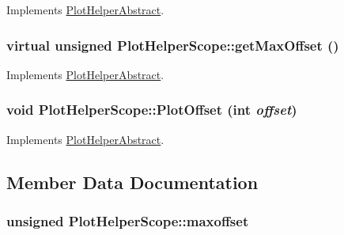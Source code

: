 Implements \hyperlink{class_plot_helper_abstract_63305b07bebbbaa71cedbf8e05d05dfa}{PlotHelperAbstract}.\hypertarget{class_plot_helper_scope_a57366f18a378b4c7517ee46e21ab31b}{
\subsubsection[{getMaxOffset}]{\setlength{\rightskip}{0pt plus 5cm}virtual unsigned PlotHelperScope::getMaxOffset ()}}
\label{class_plot_helper_scope_a57366f18a378b4c7517ee46e21ab31b}




Implements \hyperlink{class_plot_helper_abstract_099ed5350c367a7afbd957fe3d777eab}{PlotHelperAbstract}.\hypertarget{class_plot_helper_scope_841411e9c5faf41ee02b3c2e41ea8709}{
\subsubsection[{PlotOffset}]{\setlength{\rightskip}{0pt plus 5cm}void PlotHelperScope::PlotOffset (int {\em offset})}}
\label{class_plot_helper_scope_841411e9c5faf41ee02b3c2e41ea8709}




Implements \hyperlink{class_plot_helper_abstract_f6e3d62673650c86bee9191cd8ca3800}{PlotHelperAbstract}.

\subsection{Member Data Documentation}
\hypertarget{class_plot_helper_scope_d17eedd76172d6862dc854619680c491}{
\subsubsection[{maxoffset}]{\setlength{\rightskip}{0pt plus 5cm}unsigned {\bf PlotHelperScope::maxoffset}}}
\label{class_plot_helper_scope_d17eedd76172d6862dc854619680c491}


